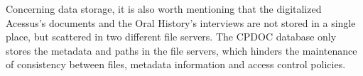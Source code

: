 %


Concerning data storage, it is also worth mentioning that the
digitalized Acessus's documents and the Oral History's interviews are
not stored in a single place, but scattered in two different file
servers. The CPDOC database only stores the metadata and paths in the
file servers, which hinders the maintenance of consistency between
files, metadata information and access control policies.

